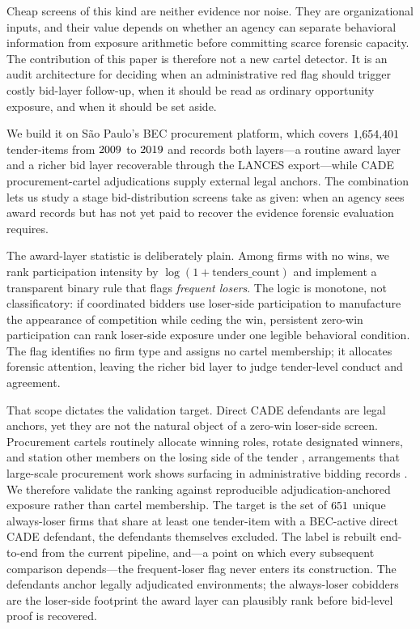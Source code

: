 Cheap screens of this kind are neither evidence nor noise. They are
organizational inputs, and their value depends on whether an agency
can separate behavioral information from exposure arithmetic before
committing scarce forensic capacity. The contribution of this paper
is therefore not a new cartel detector. It is an audit architecture
for deciding when an administrative red flag should trigger costly
bid-layer follow-up, when it should be read as ordinary opportunity
exposure, and when it should be set aside.

We build it on S\~ao Paulo's BEC procurement platform, which covers
$1{,}654{,}401$ tender-items from $2009$ to $2019$ and
records both layers---a routine award layer and a richer bid layer
recoverable through the LANCES export---while CADE procurement-cartel
adjudications supply external legal anchors. The combination lets us
study a stage bid-distribution screens take as given: when an agency
sees award records but has not yet paid to recover the evidence
forensic evaluation requires.

The award-layer statistic is deliberately plain. Among firms with no
wins, we rank participation intensity by $\log(1+\text{tenders\_count})$
and implement a transparent binary rule that flags \emph{frequent
losers}. The logic is monotone, not classificatory: if coordinated
bidders use loser-side participation to manufacture the appearance of
competition while ceding the win, persistent zero-win participation
can rank loser-side exposure under one legible behavioral condition.
The flag identifies no firm type and assigns no cartel membership; it
allocates forensic attention, leaving the richer bid layer to judge
tender-level conduct and agreement.

That scope dictates the validation target. Direct CADE defendants are
legal anchors, yet they are not the natural object of a zero-win
loser-side screen. Procurement cartels routinely allocate winning
roles, rotate designated winners, and station other members on the
losing side of the tender
\citep{pesendorfer2000study,asker2010leniency,marshall2012economics},
arrangements that large-scale procurement work shows surfacing in
administrative bidding records \citep{kawai2022detecting}. We
therefore validate the ranking against reproducible
adjudication-anchored exposure rather than cartel membership. The
target is the set of $651$ unique always-loser firms
that share at least one tender-item with a BEC-active direct CADE
defendant, the defendants themselves excluded. The label is rebuilt
end-to-end from the current pipeline, and---a point on which every
subsequent comparison depends---the frequent-loser flag never enters
its construction. The defendants anchor legally adjudicated
environments; the always-loser cobidders are the loser-side footprint
the award layer can plausibly rank before bid-level proof is recovered.


